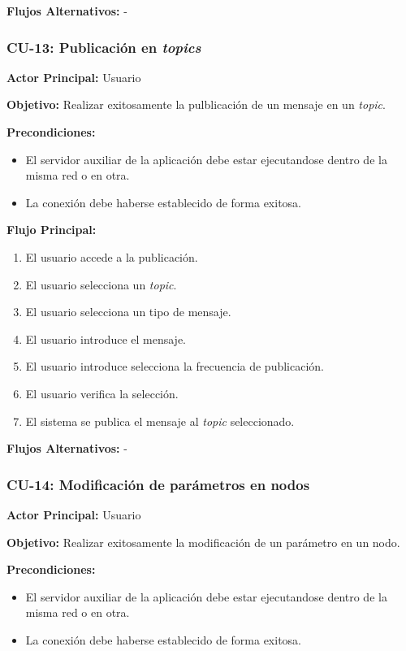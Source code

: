 \textbf{Flujos Alternativos:}
-

\subsubsection{CU-13: Publicación en \textit{topics}}

\textbf{Actor Principal:} Usuario

\textbf{Objetivo:}
Realizar exitosamente la pulblicación de un mensaje en un \textit{topic}.

\textbf{Precondiciones:}
\begin{itemize}
    \item El servidor auxiliar de la aplicación debe estar ejecutandose dentro de la misma red o en otra. 
    \item La conexión debe haberse establecido de forma exitosa.
\end{itemize}

\textbf{Flujo Principal:}
\begin{enumerate}
    \item El usuario accede a la publicación.  
    \item El usuario selecciona un \textit{topic}.
    \item El usuario selecciona un tipo de mensaje.
    \item El usuario introduce el mensaje.
    \item El usuario introduce selecciona la frecuencia de publicación.
    \item El usuario verifica la selección.
    \item El sistema se publica el mensaje al \textit{topic} seleccionado.
\end{enumerate}

\textbf{Flujos Alternativos:}
-

\subsubsection{CU-14: Modificación de parámetros en nodos}

\textbf{Actor Principal:} Usuario

\textbf{Objetivo:}
Realizar exitosamente la modificación de un parámetro en un nodo.

\textbf{Precondiciones:}
\begin{itemize}
    \item El servidor auxiliar de la aplicación debe estar ejecutandose dentro de la misma red o en otra. 
    \item La conexión debe haberse establecido de forma exitosa.
\end{itemize}

